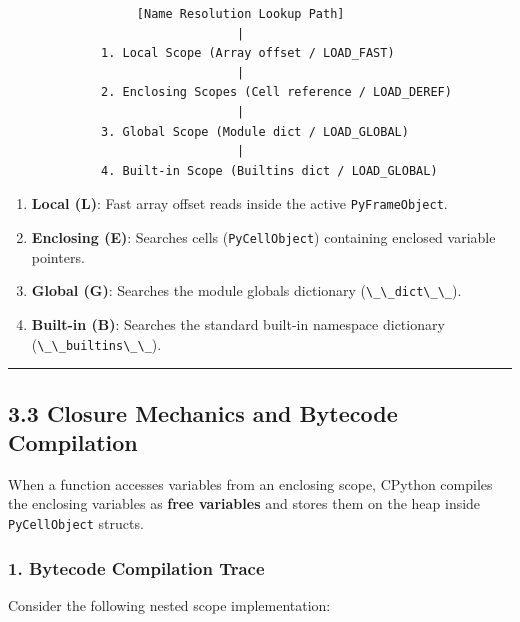 \begin{lstlisting}
                  [Name Resolution Lookup Path]
                                |
             1. Local Scope (Array offset / LOAD_FAST)
                                |
             2. Enclosing Scopes (Cell reference / LOAD_DEREF)
                                |
             3. Global Scope (Module dict / LOAD_GLOBAL)
                                |
             4. Built-in Scope (Builtins dict / LOAD_GLOBAL)
\end{lstlisting}

\begin{enumerate}
\def\labelenumi{\arabic{enumi}.}
\tightlist
\item
  \textbf{Local (L)}: Fast array offset reads inside the active
  \passthrough{\lstinline!PyFrameObject!}.
\item
  \textbf{Enclosing (E)}: Searches cells
  (\passthrough{\lstinline!PyCellObject!}) containing enclosed variable
  pointers.
\item
  \textbf{Global (G)}: Searches the module globals dictionary
  (\passthrough{\lstinline!\_\_dict\_\_!}).
\item
  \textbf{Built-in (B)}: Searches the standard built-in namespace
  dictionary (\passthrough{\lstinline!\_\_builtins\_\_!}).
\end{enumerate}

\begin{center}\rule{0.5\linewidth}{0.5pt}\end{center}

\hypertarget{closure-mechanics-and-bytecode-compilation}{%
\subsection{3.3 Closure Mechanics and Bytecode
Compilation}\label{closure-mechanics-and-bytecode-compilation}}

When a function accesses variables from an enclosing scope, CPython
compiles the enclosing variables as \textbf{free variables} and stores
them on the heap inside \passthrough{\lstinline!PyCellObject!} structs.

\hypertarget{bytecode-compilation-trace}{%
\subsubsection{1. Bytecode Compilation
Trace}\label{bytecode-compilation-trace}}

Consider the following nested scope implementation:

